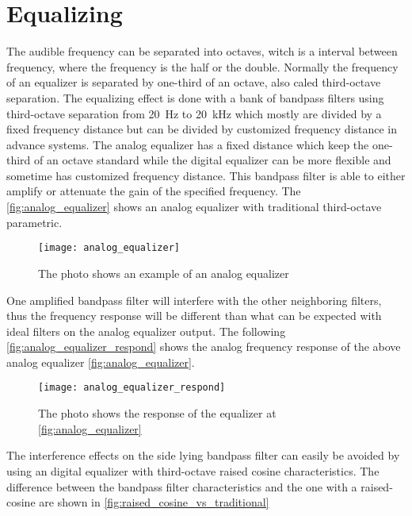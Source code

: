 \section{Equalizing}
The audible frequency can be separated into octaves, witch is a interval between frequency, where the frequency is the half or the double. Normally the frequency of an equalizer is separated by one-third of an octave, also caled third-octave separation.
The equalizing effect is done with a bank of bandpass filters using third-octave separation from \SI{20}{\hertz} to \SI{20}{\kilo\hertz} which mostly are divided by a fixed frequency distance but can be divided by customized frequency distance in advance systems. The analog equalizer has a fixed distance which keep the one-third of an octave standard while the digital equalizer can be more flexible and sometime has customized frequency distance. This bandpass filter is able to either amplify or attenuate the gain of the specified frequency. The \autoref{fig:analog_equalizer} shows an analog equalizer with traditional third-octave parametric. \citep{nordic}

\begin{figure} [htbp]
 \centering
  \texttt{[image: analog\_equalizer]}
  \caption{The photo shows an example of an analog equalizer}
  \label{fig:analog_equalizer}
\end{figure}

One amplified bandpass filter will interfere with the other neighboring filters, thus the frequency response will be different than what can be expected with ideal filters on the analog equalizer output. The following \autoref{fig:analog_equalizer_respond} shows the analog frequency response of the above analog equalizer \autoref{fig:analog_equalizer}.

\begin{figure} [htbp]
 \centering
  \texttt{[image: analog\_equalizer\_respond]}
  \caption{The photo shows the response of the equalizer at \autoref{fig:analog_equalizer} }
  \label{fig:analog_equalizer_respond}
\end{figure}

The interference effects on the side lying bandpass filter can easily be avoided by using an digital equalizer with third-octave raised cosine characteristics. The difference between the  bandpass filter characteristics and the one with a raised-cosine are shown in \autoref{fig:raised_cosine_vs_traditional}

